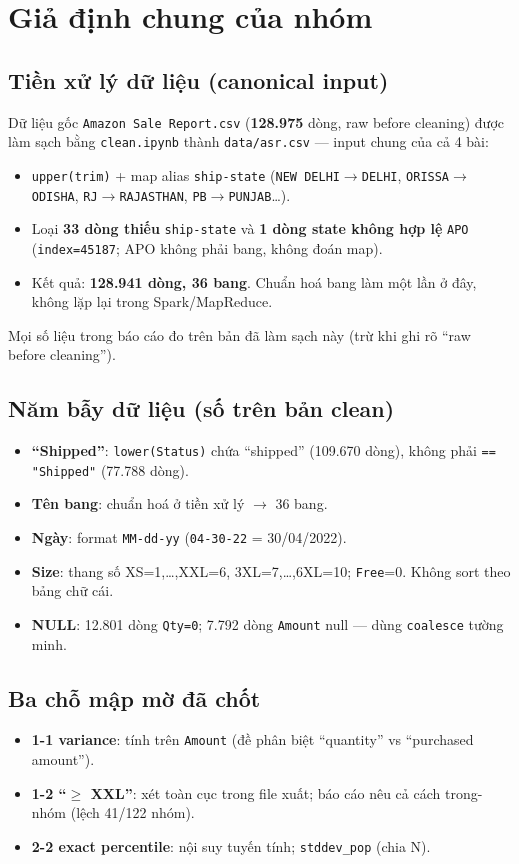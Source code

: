 \section*{Giả định chung của nhóm}

\subsection*{Tiền xử lý dữ liệu (canonical input)}
Dữ liệu gốc \texttt{Amazon Sale Report.csv} (\textbf{128.975} dòng, raw before cleaning) được làm
sạch bằng \texttt{clean.ipynb} thành \texttt{data/asr.csv} --- input chung của cả 4 bài:
\begin{itemize}
  \item \texttt{upper(trim)} + map alias \texttt{ship-state} (\texttt{NEW DELHI}$\to$\texttt{DELHI},
        \texttt{ORISSA}$\to$\texttt{ODISHA}, \texttt{RJ}$\to$\texttt{RAJASTHAN}, \texttt{PB}$\to$\texttt{PUNJAB}\ldots).
  \item Loại \textbf{33 dòng thiếu} \texttt{ship-state} và \textbf{1 dòng state không hợp lệ} \texttt{APO}
        (\texttt{index=45187}; APO không phải bang, không đoán map).
  \item Kết quả: \textbf{128.941 dòng, 36 bang}. Chuẩn hoá bang làm một lần ở đây, không lặp lại trong Spark/MapReduce.
\end{itemize}
Mọi số liệu trong báo cáo đo trên bản đã làm sạch này (trừ khi ghi rõ ``raw before cleaning'').

\subsection*{Năm bẫy dữ liệu (số trên bản clean)}
\begin{itemize}
  \item \textbf{``Shipped''}: \texttt{lower(Status)} chứa ``shipped'' (109.670 dòng), không phải \texttt{== "Shipped"} (77.788 dòng).
  \item \textbf{Tên bang}: chuẩn hoá ở tiền xử lý $\to$ 36 bang.
  \item \textbf{Ngày}: format \texttt{MM-dd-yy} (\texttt{04-30-22} = 30/04/2022).
  \item \textbf{Size}: thang số XS=1,\ldots,XXL=6, 3XL=7,\ldots,6XL=10; \texttt{Free}=0. Không sort theo bảng chữ cái.
  \item \textbf{NULL}: 12.801 dòng \texttt{Qty=0}; 7.792 dòng \texttt{Amount} null --- dùng \texttt{coalesce} tường minh.
\end{itemize}

\subsection*{Ba chỗ mập mờ đã chốt}
\begin{itemize}
  \item \textbf{1-1 variance}: tính trên \texttt{Amount} (đề phân biệt ``quantity'' vs ``purchased amount'').
  \item \textbf{1-2 ``$\ge$ XXL''}: xét toàn cục trong file xuất; báo cáo nêu cả cách trong-nhóm (lệch 41/122 nhóm).
  \item \textbf{2-2 exact percentile}: nội suy tuyến tính; \texttt{stddev\_pop} (chia N).
\end{itemize}
